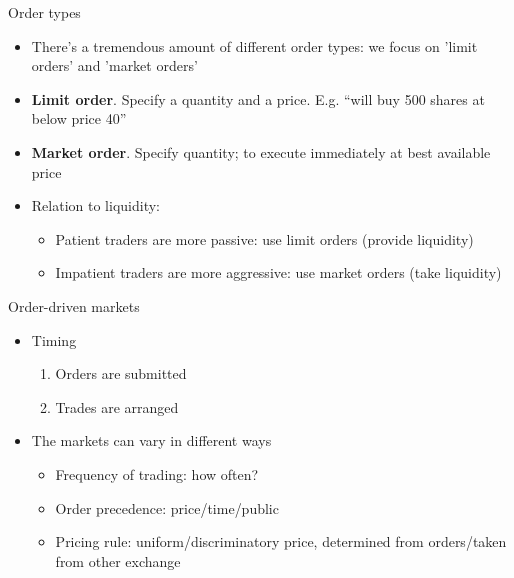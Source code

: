 \documentclass[english,10pt]{beamer}
\theoremstyle{definition}
\begin{document}
\begin{frame}{Order types}

\begin{itemize}

\item There's a tremendous amount of different order types: we focus on 'limit orders' and 'market orders'

\item \textbf{Limit order}. Specify a quantity and a price. E.g. ``will buy 500 shares at below price 40''


\item \textbf{Market order}. Specify quantity; to execute immediately at best available price


\item Relation to liquidity:
\begin{itemize}
\item Patient traders are more passive: use limit orders (provide liquidity)
\item Impatient traders are more aggressive: use market orders (take liquidity)
\end{itemize}
\end{itemize}

\end{frame}



\begin{frame}{Order-driven markets}

\begin{itemize}

\item Timing

\begin{enumerate}
\item Orders are submitted
\item Trades are arranged
\end{enumerate}
 

\item The markets can vary in different ways
\begin{itemize}
\item Frequency of trading: how often?

\item Order precedence: price/time/public


\item Pricing rule: uniform/discriminatory price, determined from orders/taken from other exchange

\end{itemize}

\end{itemize}


\end{frame}
\end{document}
